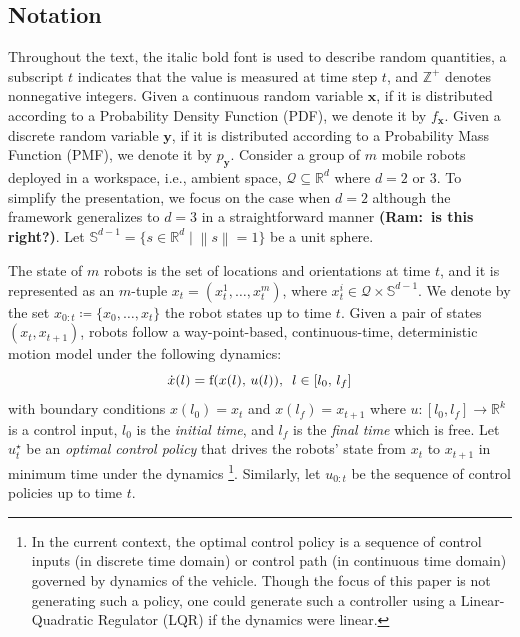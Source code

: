 \documentclass[letterpaper, 10 pt, conference]{ieeeconf}
\newcommand{\Ram}[1]{{\normalsize{\textbf{({\color{green}Ram:\ }#1)}}}}
\begin{document}
\subsection{Notation}
\label{sec:sec21}
Throughout the text, the italic bold font is used to describe random quantities, a subscript $t$ indicates that the value is measured at time step $t$, and $\mathbb{Z}^{+}$ denotes nonnegative integers. %
Given a continuous random variable $\bm{x}$, if it is distributed according to a Probability Density Function (PDF), we denote it by $f_{\bm{x}}$.
Given a discrete random variable $\bm{y}$, if it is distributed according to a Probability Mass Function (PMF), we denote it by $p_{\bm{y}}$.
Consider a group of $m$ mobile robots deployed in a workspace, i.e., ambient space, $\mathcal{Q} \subseteq \mathbb{R}^d$ where $d = 2$ or $3$. 
To simplify the presentation, we focus on the case when $d=2$ although the framework generalizes to $d=3$ in a straightforward manner \Ram{is this right?}.  
Let $\mathbb{S}^{d-1} = \lbrace s\in \mathbb{R}^d\mid \left\| s \right\|=1 \rbrace$ be a unit sphere. 

The state of $m$ robots is the set of locations and orientations at time $t$, and it is represented as an $m$-tuple $x_t = (x_t^1,\dots,x_t^m)$, where $x_t^i \in \mathcal{Q} \times \mathbb{S}^{d-1}$. 
We denote by the set ${x}_{0:t}\coloneqq \lbrace {x}_0,\dots,{x}_t \rbrace$ the robot states up to time $t$. 
Given a pair of states $(x_t,x_{t+1})$, robots follow a way-point-based, continuous-time, deterministic motion model under the following dynamics:
\begin{equation}
\dot{x}(l) = \textup{f}(x(l),\,u(l)), \,\,\, l \in [l_0,\,l_f]
\label{eq:constraint}
\end{equation}
with boundary conditions $x(l_0) = x_t$ and $x(l_f) = x_{t+1}$ where $u: [l_0,l_f] \to \mathbb{R}^k$ is a control input, $l_0$ is the \emph{initial time}, and $l_f$ is the \emph{final time} which is free. 
Let $u_t^{\star}$ be an \emph{optimal control policy} that drives the robots' state from $x_t$ to $x_{t+1}$ in minimum time under the dynamics \footnote{In the current context, the optimal control policy is a sequence of control inputs (in discrete time domain) or control path (in continuous time domain) governed by dynamics of the vehicle. Though the focus of this paper is not generating such a policy, one could generate such a controller using a Linear-Quadratic Regulator (LQR) if the dynamics were linear.}. 
Similarly, let $u_{0:t}$ be the sequence of control policies up to time $t$.
\end{document}

